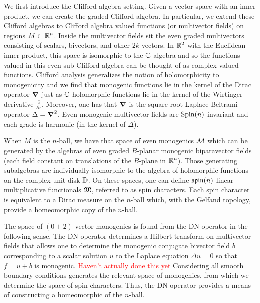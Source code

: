 We first introduce the Clifford algebra setting. Given a vector space with an inner product, we can create the graded Clifford algebra.  In particular, we extend these Clifford algebras to Clifford algebra valued functions (or multivector fields) on regions $M \subset \mathbb{R}^n$.  Inside the multivector fields sit the even graded multivectors consisting of scalars, bivectors, and other $2k$-vectors. In $\mathbb{R}^2$ with the Euclidean inner product, this space is isomorphic to the $\mathbb{C}$-algebra and so the functions valued in this even sub-Clifford algebra can be thought of as complex valued functions.  Clifford analysis generalizes the notion of holomorphicity to monogenicity and we find that monogenic functions lie in the kernel of the Dirac operator $\boldsymbol{\nabla}$ just as $\mathbb{C}$-holomorphic functions lie in the kernel of the Wirtinger derivative $\frac{\partial}{\partial \overline{z}}$. Moreover, one has that $\boldsymbol{\nabla}$ is the square root Laplace-Beltrami operator $\Delta = \boldsymbol{\nabla}^2$. Even monogenic multivector fields are $\operatorname{Spin}(n)$ invariant and each grade is harmonic (in the kernel of $\Delta$). 

When $M$ is the $n$-ball, we have that space of even monogenics $\mathcal{M}$ which can be generated by the algebras of even graded $B$-planar monogenic biparavector fields (each field constant on translations of the $B$-plane in $\mathbb{R}^n$). Those generating subalgebras are individually isomorphic to the algebra of holomorphic functions on the complex unit disk $\mathbb{D}$. On these spaces, one can define $\mathfrak{spin}(n)$-linear multiplicative functionals $\mathfrak{M}$, referred to as spin characters. Each spin character is equivalent to a Dirac measure on the $n$-ball which, with the Gelfand topology, provide a homeomorphic copy of the $n$-ball.

The space of $(0+2)$-vector monogenics is found from the DN operator in the following sense.  The DN operator determines a Hilbert transform on multivector fields that allows one to determine the monogenic conjugate bivector field $b$ corresponding to a scalar solution $u$ to the Laplace equation $\Delta u = 0$ so that $f=u+b$ is monogenic. \textcolor{red}{Haven't actually done this yet} Considering all smooth boundary conditions generates the relevant space of monogenics, from which we determine the space of spin characters. Thus, the DN operator provides a means of constructing a homeomorphic of the $n$-ball.